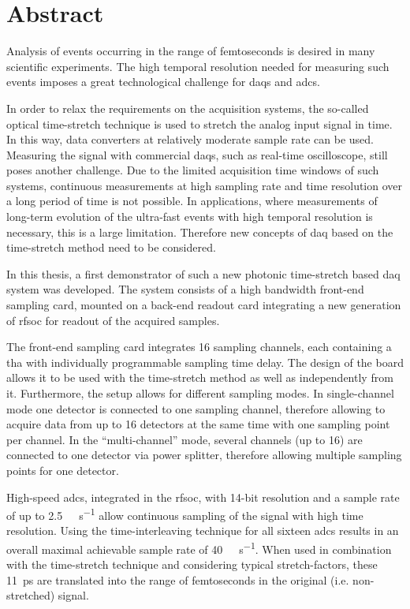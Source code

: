 \chapter*{Abstract}

Analysis of events occurring in the range of femtoseconds is desired in many scientific experiments.
The high temporal resolution needed for measuring such events imposes a great technological challenge for \glspl{daq} and \glspl{adc}.

In order to relax the requirements on the acquisition systems, the so-called optical time-stretch technique is used to stretch the analog input signal in time.
In this way, data converters at relatively moderate sample rate can be used.
Measuring the signal with commercial \glspl{daq}, such as real-time oscilloscope, still poses another challenge.
Due to the limited acquisition time windows of such systems, continuous measurements at high sampling rate and time resolution over a long period of time is not possible.
In applications, where measurements of long-term evolution of the ultra-fast events with high temporal resolution is necessary, this is a large limitation.
Therefore new concepts of \gls{daq} based on the time-stretch method need to be considered.

In this thesis, a first demonstrator of such a new photonic time-stretch based \gls{daq} system was developed.
The system consists of a high bandwidth front-end sampling card, mounted on a back-end readout card integrating a new generation of \gls{rfsoc} for readout of the acquired samples. 

The front-end sampling card integrates 16 sampling channels, each containing a \gls{tha} with individually programmable sampling time delay. 
The design of the board allows it to be used with the time-stretch method as well as independently from it.
Furthermore, the setup allows for different sampling modes.
In single-channel mode one detector is connected to one sampling channel, therefore allowing to acquire data from up to 16 detectors at the same time with one sampling point per channel.
In the ``multi-channel'' mode, several channels (up to 16) are connected to one detector via power splitter, therefore allowing multiple sampling points for one detector.

High-speed \glspl{adc}, integrated in the \gls{rfsoc}, with 14-bit resolution and a sample rate of up to \SI{2.5}{\giga \sample \per \second} allow continuous sampling of the signal with high time resolution. 
Using the time-interleaving technique for all sixteen \glspl{adc} results in an overall maximal achievable sample rate of \SI{40}{\giga \sample \per \second}.  
When used in combination with the time-stretch technique and considering typical stretch-factors, these \SI{11}{\pico \second} are translated into the range of femtoseconds in the original (i.e. non-stretched) signal.

